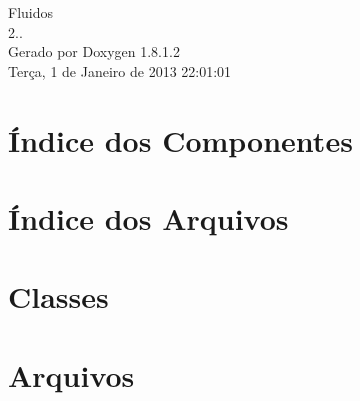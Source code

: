 \documentclass{book}
\begin{document}
\hypersetup{pageanchor=false,citecolor=blue}
\begin{titlepage}
\vspace*{7cm}
\begin{center}
{\Large Fluidos \\[1ex]\large 2.. }\\
\vspace*{1cm}
{\large Gerado por Doxygen 1.8.1.2}\\
\vspace*{0.5cm}
{\small Terça, 1 de Janeiro de 2013 22:01:01}\\
\end{center}
\end{titlepage}
\clearemptydoublepage
{}
\tableofcontents
\clearemptydoublepage
{}
\hypersetup{pageanchor=true,citecolor=blue}
\chapter{Índice dos Componentes}

\chapter{Índice dos Arquivos}

\chapter{Classes}



\chapter{Arquivos}














\printindex
\end{document}
